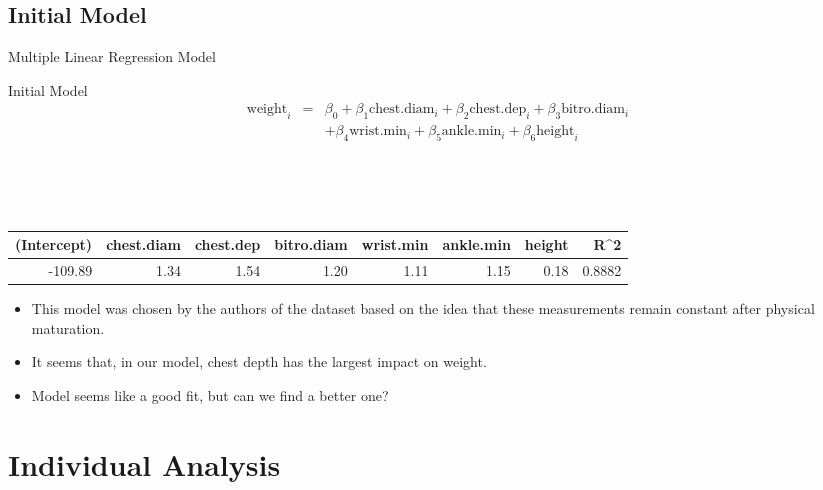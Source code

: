 \documentclass[table]{beamer}\usepackage[]{graphicx}\usepackage[]{color}
\begin{document}

\subsection{Initial Model}


\begin{frame}{Multiple Linear Regression Model}

\begin{block}{Initial Model}
\begin{eqnarray*}
\text{weight}_i &=& \beta_0 + \beta_1 \text{chest.diam}_{i} + \beta_2 \text{chest.dep}_{i} + \beta_3 \text{bitro.diam}_{i} \\
&& + \beta_4 \text{wrist.min}_{i} + \beta_5 \text{ankle.min}_{i} + \beta_6 \text{height}_{i}
\end{eqnarray*}
\end{block}

\\

\\

\\

{\fontsize{0.275cm}{1em}\selectfont 
\begin{tabular}{|r|r|r|r|r|r|r|r|}
\hline
    (Intercept) & chest.diam & chest.dep & bitro.diam & wrist.min & ankle.min & height & R^2 \\ \hline
   -109.89 & 1.34  & 1.54 & 1.20  & 1.11 & 1.15 & 0.18 & 0.8882 \\ \hline
\end{tabular}

\begin{itemize}
  \item This model was chosen by the authors of the dataset based on the idea that these measurements remain constant after physical maturation.
  \item It seems that, in our model, chest depth has the largest impact on weight.
  \item Model seems like a good fit, but can we find a better one?
\end{itemize}

}
\end{frame}



\section{Individual Analysis}
\end{document}
